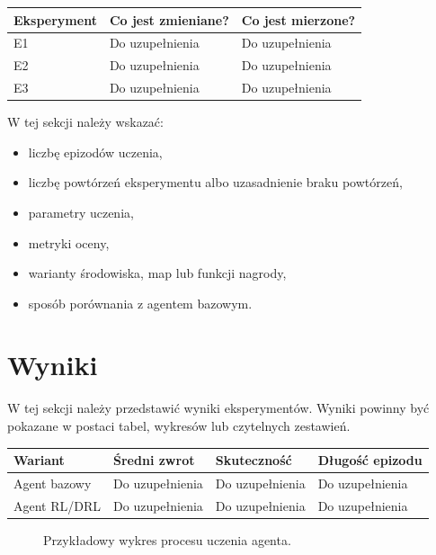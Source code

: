 \documentclass[12pt]{article}
\begin{document}
\begin{center}
\begin{tabular}{p{}p{}p{}}
\toprule
Eksperyment & Co jest zmieniane? & Co jest mierzone? \\
\midrule
E1 & Do uzupełnienia & Do uzupełnienia \\
E2 & Do uzupełnienia & Do uzupełnienia \\
E3 & Do uzupełnienia & Do uzupełnienia \\
\bottomrule
\end{tabular}
\end{center}

W tej sekcji należy wskazać:
\begin{itemize}
    \item liczbę epizodów uczenia,
    \item liczbę powtórzeń eksperymentu albo uzasadnienie braku powtórzeń,
    \item parametry uczenia,
    \item metryki oceny,
    \item warianty środowiska, map lub funkcji nagrody,
    \item sposób porównania z agentem bazowym.
\end{itemize}

\section{Wyniki}

W tej sekcji należy przedstawić wyniki eksperymentów. Wyniki powinny być pokazane w postaci tabel, wykresów lub czytelnych zestawień.

\begin{center}
\begin{tabular}{p{}p{}p{}p{}}
\toprule
Wariant & Średni zwrot & Skuteczność & Długość epizodu \\
\midrule
Agent bazowy & Do uzupełnienia & Do uzupełnienia & Do uzupełnienia \\
Agent RL/DRL & Do uzupełnienia & Do uzupełnienia & Do uzupełnienia \\
\bottomrule
\end{tabular}
\end{center}

\begin{figure}[h]
    \centering
    \caption{Przykładowy wykres procesu uczenia agenta.}
\end{figure}
\end{document}
